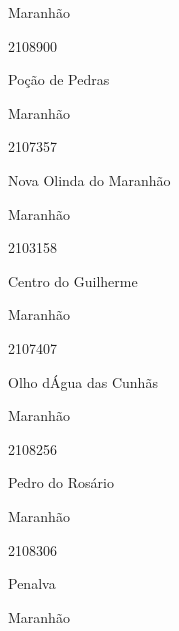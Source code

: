 \documentclass[
  letterpaper,
]{report}
\begin{document}
\n    

\n    

\n      

Maranhão

\n      

2108900

\n      

Poção de Pedras

\n    

\n    

\n      

Maranhão

\n      

2107357

\n      

Nova Olinda do Maranhão

\n    

\n    

\n      

Maranhão

\n      

2103158

\n      

Centro do Guilherme

\n    

\n    

\n      

Maranhão

\n      

2107407

\n      

Olho d\textquotesingle Água das Cunhãs

\n    

\n    

\n      

Maranhão

\n      

2108256

\n      

Pedro do Rosário

\n    

\n    

\n      

Maranhão

\n      

2108306

\n      

Penalva

\n    

\n    

\n      

Maranhão
\end{document}
